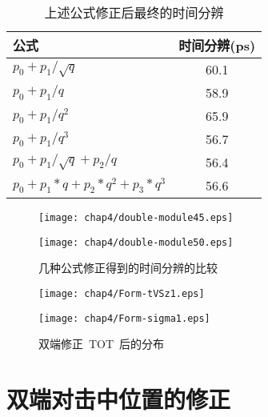 \begin{table}[h]
    \centering
    \caption{\label{tbl:combined-resolution} 上述公式修正后最终的时间分辨}
  \footnotesize
    \begin{tabular}{lc}
        \hline
        公式& 时间分辨(ps) \\
        \hline
        ${p_{0}+p_{1}/\sqrt{q}}$ & 60.1 \\
        ${p_{0}+p_{1}/q}$ & 58.9 \\
        ${p_{0}+p_{1}/q^{2}}$ & 65.9 \\
        ${p_{0}+p_{1}/q^{3}}$ & 56.7 \\
        ${p_{0}+p_{1}/\sqrt{q}+p_{2}/q}$ & 56.4 \\
        ${p_{0}+p_{1}*q+p_{2}*q^{2}+p_{3}*q^3}$ & 56.6 \\
        \hline
    \end{tabular}
\end{table}

\begin{figure}[!h]
\begin{minipage}[!h]{0.5\linewidth}
\texttt{[image: chap4/double-module45.eps]}
\label{fig:double-module45}
\end{minipage}%
\hfill
\begin{minipage}[!h]{0.5\linewidth}
\texttt{[image: chap4/double-module50.eps]}
\label{fig:double-module50}
\end{minipage}
\caption{几种公式修正得到的时间分辨的比较}
\end{figure}

\begin{figure}[!h]
\begin{minipage}[!h]{0.5\linewidth}
\texttt{[image: chap4/Form-tVSz1.eps]}
\label{fig:Form-tVSz1}
\end{minipage}%
\hfill
\begin{minipage}[!h]{0.5\linewidth}
\texttt{[image: chap4/Form-sigma1.eps]}
\label{fig:Form-sigma1}
\end{minipage}
\caption{双端修正~TOT~后的分布}
\end{figure}

\section{双端对击中位置的修正}

